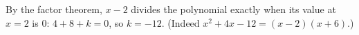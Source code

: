 By the factor theorem, $x-2$ divides the polynomial exactly when its value at $x=2$ is $0$: $4+8+k=0$, so $k=\boxed{-12}$. (Indeed $x^2+4x-12=(x-2)(x+6)$.)
